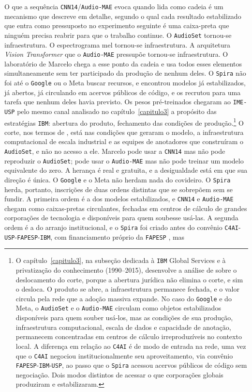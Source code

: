 O que a sequência \texttt{CNN14}/\texttt{Audio-MAE} evoca quando lida como cadeia é um mecanismo que \textcite{Latour2011CienciaEmAcao} descreve em detalhe, segundo o qual cada resultado estabilizado que entra como pressuposto no experimento seguinte é uma caixa-preta que ninguém precisa reabrir para que o trabalho continue. O \texttt{AudioSet} tornou-se infraestrutura. O espectrograma mel tornou-se infraestrutura. A arquitetura \textit{Vision Transformer} que o \texttt{Audio-MAE} pressupõe tornou-se infraestrutura. O laboratório de Marcelo chega a esse ponto da cadeia e usa todos esses elementos simultaneamente sem ter participado da produção de nenhum deles. O \texttt{Spira} não foi até o \texttt{Google} ou o Meta buscar recursos, e encontrou modelos já estabilizados, já abertos, já circulando em acervos públicos de código, e os recrutou para uma tarefa que nenhum deles havia previsto. Os pesos pré-treinados chegaram ao \texttt{IME-USP} pelo mesmo canal analisado no capítulo~\ref{capitulo3} a propósito das estratégias \texttt{IBM}: abertura do produto, fechamento das condições de produção.\footnote{O capítulo~\ref{capitulo3}, na subseção dedicada à \texttt{IBM} Global Services e à privatização do conhecimento (1990--2015), desenvolve a análise de \textcite{strathern2011cortando} sobre o deslocamento do corte, porque a abertura jurídica não elimina o corte, e sim o desloca. O produto se abre, a infraestrutura permanece fechada, e o valor circula pela rede que a adoção massiva expande. No caso do \texttt{Google} e do Meta, o \texttt{AudioSet} e o \texttt{Audio-MAE} circulam como objetos estabilizados disponíveis para quem souber usá-los, mas as condições de sua produção, infraestrutura computacional, escala de dados e capacidade de anotação, permanecem concentradas em centros de cálculo irreproduzíveis no contexto local. A diferença em relação ao \texttt{C4AI} é de modo de entrada na rede, uma vez que o \texttt{C4AI} negociou institucionalmente seu aproveitamento, via convênio \texttt{FAPESP}-\texttt{IBM}-\texttt{USP}, ao passo que o \texttt{Spira} acessou acervos públicos de código sem negociação. Dois modos distintos de acessar o que corporações globais produziram e estabilizaram.} O corte, nos termos de \textcite{strathern2011cortando}, está nas condições que geraram o modelo, a infraestrutura computacional de escala industrial e as equipes de anotadores que construíram o \texttt{AudioSet}, e não no acesso a ele. Marcelo pode usar a \texttt{CNN14} mas não pode reproduzir o \texttt{AudioSet}; pode usar o \texttt{Audio-MAE} mas não pode treinar um modelo equivalente do zero. A herança é real e gratuita, e a desigualdade está em que sua direção é única. O \texttt{Google} e o Meta não herdam nada do covideiro. O \texttt{Spira} herda, portanto, inscrições de duas ordens distintas que se sobrepõem sem se fundir. A primeira ordem é a dos modelos estabilizados, e \texttt{CNN14} e \texttt{Audio-MAE} chegam como caixas-pretas circulantes, fechadas em centros de cálculo de grandes corporações de tecnologia e disponíveis para quem soubesse usá-las. A segunda ordem é a do arranjo institucional, e o \texttt{Spira} foi criado antes do convênio \texttt{C4AI}-\texttt{USP}-\texttt{FAPESP}-\texttt{IBM}, com financiamento próprio da \texttt{FAPESP} \parencite{Casanova2021DeepLearning}, mas 